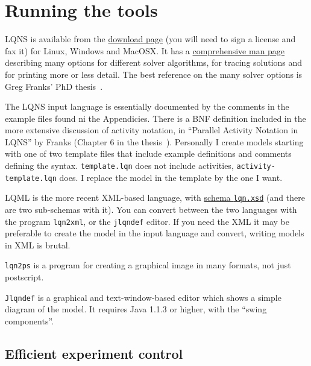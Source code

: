 \documentclass[11pt]{article}
\begin{document}
\section{Running the tools}
\label{sec:execution}

LQNS is available from the \href{http://www.sce.carleton.ca/rads/lqns/LQNSDownload}{download page} (you will need to sign a license and fax it) for
Linux, Windows and MacOSX. It has a \href{http://www.sce.carleton.ca/rads/lqns/lqn-documentation/lqns.pdf}{comprehensive man page}
describing many options for different solver algorithms, for tracing solutions and for printing more
or less detail. The best reference on the many solver options is Greg Franks' PhD thesis~\cite{THESIS:franks-99}.

The LQNS input language is essentially documented by the comments in
the example files found ni the Appendicies.
There is a BNF definition included in the more extensive discussion of activity notation, in
``Parallel Activity Notation in LQNS'' by Franks (Chapter 6 in the thesis~\cite{THESIS:franks-99}). Personally I
create models starting with one of two template files that include example definitions and comments
defining the syntax. \texttt{template.lqn} does not include activities, \texttt{activity-template.lqn}
does. I replace the model in the template by the one I want.

LQML is the more recent XML-based language, with \href{http://www.sce.carleton.ca/rads/lqns/lqn-schema/lqn.xsd''}{schema \texttt{lqn.xsd}} (and there are two
sub-schemas with it). You can convert between the two languages with the program \texttt{lqn2xml}, or the
\texttt{jlqndef} editor. If you need the XML it may be preferable to create the model in the input language
and convert, writing models in XML is brutal.

\texttt{lqn2ps} is a program for creating a graphical image in many formats, not just postscript.

\texttt{Jlqndef} is a graphical and text-window-based editor which shows a simple diagram of the
model. It requires Java 1.1.3 or higher, with the ``swing components''.

\subsection{Efficient experiment control}
\label{sec:spex}
\end{document}
